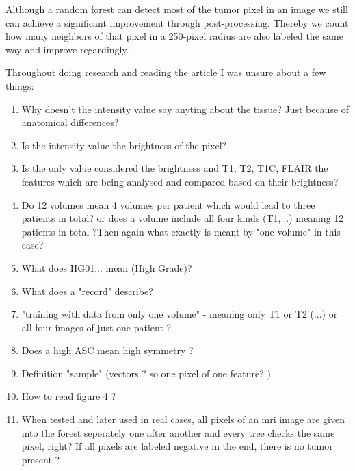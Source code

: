 \documentclass{article}
\begin{document}
 Although a random forest can detect most of the tumor pixel in an image we still can achieve a significant improvement through post-processing. Thereby we count how many neighbors of that pixel in a 250-pixel radius are also labeled the same way and improve regardingly. \\
 

 \newpage

 Throughout doing research and reading the article I was unsure about a few things:

 \begin{enumerate}
     \item Why doesn't the intensity value say anyting about the tissue? Just because of anatomical differences? 
     \item Is the intensity value the brightness of the pixel? 
     \item Is the only value considered the brightness and T1, T2, T1C, FLAIR the features which are being analysed and compared based on their brightness? 
     \item Do 12 volumes mean 4 volumes per patient which would lead to three patients in total? or does a volume include all four kinds (T1,...) meaning 12 patients in total ?Then again what exactly is meant by "one volume" in this case? 
     \item What does HG01,.. mean (High Grade)? 
     \item What does a "record" describe? 
     \item "training with data from only one volume" - meaning only T1 or T2 (...) or all four images of just one patient ? 
     \item Does a high ASC mean high symmetry ?
     \item Definition "sample" (vectors ? so one pixel of one feature? )
     \item How to read figure 4 ? 
     \item When tested and later used in real cases, all pixels of an mri image are given into the forest seperately one after another and every tree checks the same pixel, right? If all pixels are labeled negative in the end, there is no tumor present ? 
    \end{enumerate}
\end{document}

